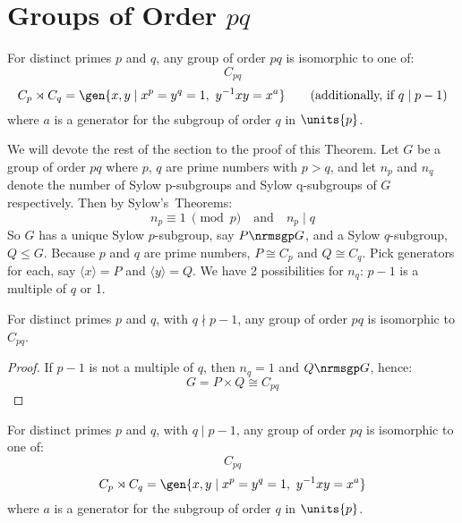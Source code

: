 \section{Groups of Order \(pq\)}
\begin{theorem}\label{thm:pq}
    For distinct primes \(p\) and \(q\), any group of order \(pq\) is isomorphic to one of:
    \[C_{pq}\]
    \[C_{p} \rtimes C_{q} = \gen{x, y \mid x^p = y^q = 1,\ y^{-1}xy = x^a} \tag{additionally, if \(q \mid p-1\)}\]
    where \(a\) is a generator for the subgroup of order \(q\) in \(\units{p}\).
\end{theorem}

We will devote the rest of the section to the proof of this Theorem.
Let \(G\) be a group of order \(pq\) where \(p\), \(q\) are prime numbers with \(p > q\), and let \(n_p\) and \(n_q\)
denote the number of Sylow p-subgroups and Sylow q-subgroups of \(G\) respectively.
Then by Sylow's~Theorems:
\[n_p \equiv 1 \ \pmod{p} \quad \text{and} \quad n_p \mid q\]
So \(G\) has a unique Sylow \(p\)-subgroup, say \(P \nrmsgp G\), and a Sylow \(q\)-subgroup, \(Q \leqslant G\).
Because \(p\) and \(q\) are prime numbers, \(P \cong C_p\) and \(Q \cong C_q\).
Pick generators for each, say \(\langle x \rangle  = P\) and \(\langle y \rangle = Q\).
We have 2 possibilities for \(n_q\): \(p-1\) is a multiple of \(q\) or 1.

\begin{lemma}
    For distinct primes \(p\) and \(q\), with \(q \nmid p-1\), any group of order \(pq\) is isomorphic to \(C_{pq}\).
\end{lemma}

\begin{proof}
    If \(p-1\) is not a multiple of \(q\), then \(n_q = 1\) and \(Q \nrmsgp G\), hence:
    \[G = P \times Q \cong C_{pq}\]
\end{proof}

\begin{lemma}
    For distinct primes \(p\) and \(q\), with \(q \mid p-1\), any group of order \(pq\) is isomorphic to one of:
    \[C_{pq}\]
    \[C_{p} \rtimes C_{q} = \gen{x, y \mid x^p = y^q = 1,\ y^{-1}xy = x^a}\]
    where \(a\) is a generator for the subgroup of order \(q\) in \(\units{p}\).
\end{lemma}

